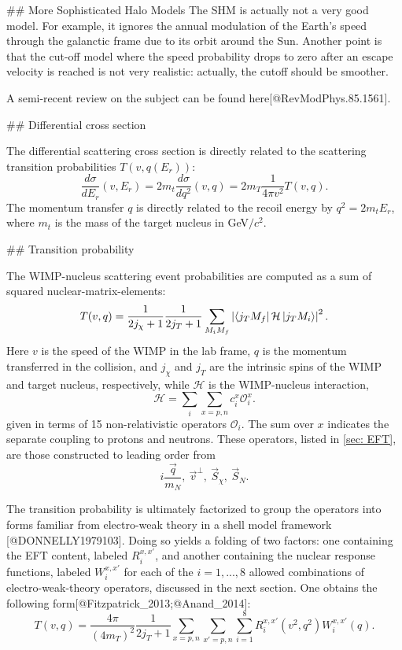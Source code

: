 ## More Sophisticated Halo Models
The SHM is actually not a very good model. For example, it ignores the annual
modulation of the Earth's speed through the galanctic frame due to its orbit
around the Sun. Another point is that the cut-off model where the speed
probability drops to zero after an escape velocity is reached is not very
realistic: actually, the cutoff should be smoother. 

A semi-recent review on the subject can be found here[@RevModPhys.85.1561].

## Differential cross section

The differential scattering cross section is directly related to the scattering
transition probabilities $T(v,q(E_r))$: 
\begin{equation}
    \frac{d\sigma}{dE_r}(v,E_r) = 2m_t\frac{d\sigma}{dq^2}(v,q) = 2m_T\frac{1}{4\pi v^2} T(v,q).
\end{equation} 
The momentum transfer $q$ is directly related to the recoil energy by
$q^2=2m_tE_r$, where $m_t$ is the mass of the target nucleus in GeV$/c^2$.


## Transition probability

The WIMP-nucleus scattering event probabilities are computed as a sum of squared
nuclear-matrix-elements:
\begin{equation}
    T(v,q) = \frac{1}{2j_\chi +1}\frac{1}{2j_T+1} \sum_{M_i M_f} \left |\bra{j_TM_f} \mathcal{H} \ket{j_TM_i}\right |^2.
\end{equation}
Here $v$ is the speed of the WIMP in the lab frame, $q$ is the momentum
transferred in the collision, and $j_\chi$ and $j_T$ are the intrinsic spins of
the WIMP and target nucleus, respectively, while  $\mathcal{H}$ is the
WIMP-nucleus interaction,
\begin{equation}
    \mathcal{H} = \sum_i\sum_{x=p,n}c_i^x\mathcal{O}_i^x.
\end{equation}
given in terms of 15 non-relativistic operators $\mathcal{O}_i$. The sum over
$x$ indicates the separate coupling to protons and neutrons. These operators,
listed in \ref{sec: EFT}, are those  constructed to leading order from
\begin{equation}
    i\frac{\vec{q}}{m_N},\ \vec{v}^\perp,\ \vec{S}_\chi,\ \vec{S}_N.
\end{equation}

The transition probability is ultimately factorized to group the operators into
forms familiar from electro-weak theory in a shell model framework
[@DONNELLY1979103]. Doing so yields a folding of two factors: one containing
the EFT content, labeled $R_i^{x,x'}$, and another containing the nuclear
response functions, labeled $W_i^{x,x'}$ for each of the $i=1,...,8$ allowed
combinations of electro-weak-theory operators, discussed in the next section.
One obtains the following form[@Fitzpatrick_2013;@Anand_2014]:
\begin{equation}
    T(v,q) = \frac{4\pi}{(4m_T)^2} \frac{1}{2j_T+1} \sum_{x=p,n}\sum_{x'=p,n}\sum_{i=1}^8 R_i^{x,x'}(v^2,q^2)W_i^{x,x'}(q).
\end{equation}

